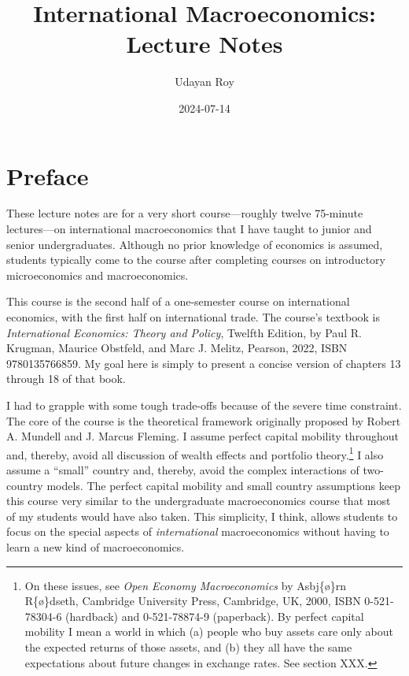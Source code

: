 \documentclass[
  letterpaper,
]{book}
\title{International Macroeconomics: Lecture Notes}
\author{Udayan Roy}
\date{2024-07-14}
\renewcommand*\contentsname{Table of contents}
\newcommand\contentsname{Table of contents}
\begin{document}
\frontmatter
\maketitle

\renewcommand*\contentsname{Table of contents}
{
\setcounter{tocdepth}{2}
\tableofcontents
}
\mainmatter
{}

\chapter*{Preface}\label{preface}


These lecture notes are for a very short course---roughly twelve
75-minute lectures---on international macroeconomics that I have taught
to junior and senior undergraduates. Although no prior knowledge of
economics is assumed, students typically come to the course after
completing courses on introductory microeconomics and macroeconomics.

This course is the second half of a one-semester course on international
economics, with the first half on international trade. The course's
textbook is \emph{International Economics: Theory and Policy}, Twelfth
Edition, by Paul R. Krugman, Maurice
Obstfeld, and Marc J.
Melitz, Pearson, 2022, ISBN 9780135766859. My goal
here is simply to present a concise version of chapters 13 through 18 of
that book.

I had to grapple with some tough trade-offs because of the severe time
constraint. The core of the course is the theoretical framework
originally proposed by Robert A. Mundell and
J. Marcus Fleming. I assume perfect capital
mobility throughout and, thereby, avoid
all discussion of wealth effects and portfolio theory.\footnote{On these
  issues, see \emph{Open Economy Macroeconomics} by Asbj\{\o\}rn
  R\{\o\}dseth, Cambridge University
  Press, Cambridge, UK, 2000, ISBN 0-521-78304-6 (hardback) and
  0-521-78874-9 (paperback). By perfect capital
  mobility I mean a world in which (a)
  people who buy assets care only about the expected returns of those
  assets, and (b) they all have the same expectations about future
  changes in exchange rates. See section XXX.} I also assume a ``small''
country and, thereby, avoid the complex interactions of two-country
models. The perfect capital mobility and small country assumptions keep
this course very similar to the undergraduate macroeconomics course that
most of my students would have also taken. This simplicity, I think,
allows students to focus on the special aspects of \emph{international}
macroeconomics without having to learn a new kind of macroeconomics.
\end{document}
